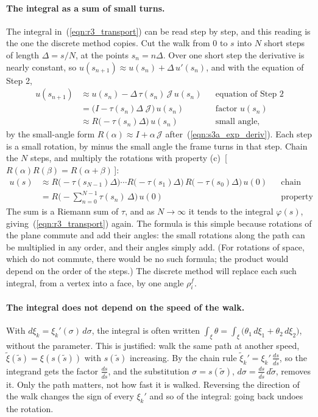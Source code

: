\paragraph{The integral as a sum of small turns.} The integral in~(\ref{eqn:r3_transport}) can be read step by step, and this reading is the one the discrete method copies. Cut the walk from $0$ to $s$ into $N$ short steps of length $\Delta = s/N$, at the points $s_n = n\Delta$. Over one short step the derivative is nearly constant, so $u(s_{n+1}) \approx u(s_n) + \Delta\, u'(s_n)$, and with the equation of Step 2,
\begin{align*}
u(s_{n+1}) &\approx u(s_n) - \Delta\,\tau(s_n)\,\mathcal J\, u(s_n) && \text{equation of Step 2} \\
&= \big(I - \tau(s_n)\Delta\;\mathcal J\big)\, u(s_n) && \text{factor } u(s_n) \\
&\approx R\big(-\tau(s_n)\Delta\big)\, u(s_n) && \text{small angle,}
\end{align*}
by the small-angle form $R(\alpha) \approx I + \alpha\,\mathcal J$ after~(\ref{eqn:s3a_exp_deriv}). Each step is a small rotation, by minus the small angle the frame turns in that step. Chain the $N$ steps, and multiply the rotations with property (c)~[\,$R(\alpha)R(\beta) = R(\alpha + \beta)$\,]:
\begin{align*}
u(s) &\approx R\big(-\tau(s_{N-1})\Delta\big)\cdots R\big(-\tau(s_1)\Delta\big)\, R\big(-\tau(s_0)\Delta\big)\, u(0) && \text{chain} \\
&= R\Big(-\sum_{n=0}^{N-1} \tau(s_n)\,\Delta\Big)\, u(0) && \text{property (c).}
\end{align*}
The sum is a Riemann sum of $\tau$, and as $N \to \infty$ it tends to the integral $\varphi(s)$, giving~(\ref{eqn:r3_transport}) again. The formula is this simple because rotations of the plane commute and add their angles: the small rotations along the path can be multiplied in any order, and their angles simply add. (For rotations of space, which do not commute, there would be no such formula; the product would depend on the order of the steps.) The discrete method will replace each such integral, from a vertex into a face, by one angle $\rho_i^f$.

\paragraph{The integral does not depend on the speed of the walk.} With $d\xi_k = \xi_k'(\sigma)\,d\sigma$, the integral is often written $\int_\xi \theta = \int_\xi \big(\theta_1\, d\xi_1 + \theta_2\, d\xi_2\big)$, without the parameter. This is justified: walk the same path at another speed, $\tilde\xi(\tilde s) = \xi(s(\tilde s))$ with $s(\tilde s)$ increasing. By the chain rule $\tilde\xi_k' = \xi_k'\, \frac{ds}{d\tilde s}$, so the integrand gets the factor $\frac{ds}{d\tilde s}$, and the substitution $\sigma = s(\tilde\sigma)$, $d\sigma = \frac{ds}{d\tilde s}\,d\tilde\sigma$, removes it. Only the path matters, not how fast it is walked. Reversing the direction of the walk changes the sign of every $\xi_k'$ and so of the integral: going back undoes the rotation.

